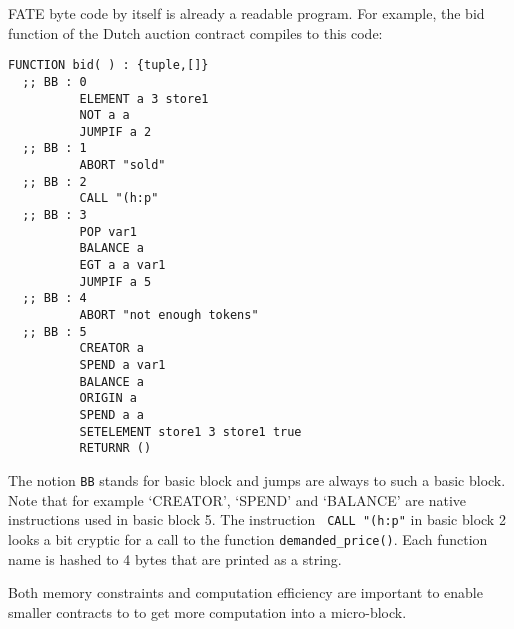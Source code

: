 FATE byte code by itself is already a readable program. For example, the bid
function of the Dutch auction contract compiles to this code:

\begin{verbatim}
FUNCTION bid( ) : {tuple,[]}
  ;; BB : 0
          ELEMENT a 3 store1
          NOT a a
          JUMPIF a 2
  ;; BB : 1
          ABORT "sold"
  ;; BB : 2
          CALL "(h:p"
  ;; BB : 3
          POP var1
          BALANCE a
          EGT a a var1
          JUMPIF a 5
  ;; BB : 4
          ABORT "not enough tokens"
  ;; BB : 5
          CREATOR a
          SPEND a var1
          BALANCE a
          ORIGIN a
          SPEND a a
          SETELEMENT store1 3 store1 true
          RETURNR ()
\end{verbatim}

The notion \verb+BB+ stands for basic block and jumps are always to
such a basic block. Note that for example `CREATOR', `SPEND' and
`BALANCE' are native instructions used in basic block 5. The
instruction \verb+ CALL "(h:p"+ in basic block 2 looks a bit cryptic for a call
to  the
function \verb+demanded_price()+. Each function name is hashed to 4
bytes that are printed as a string.

Both memory constraints and computation efficiency are important to
enable smaller contracts to to get more computation into a micro-block.
